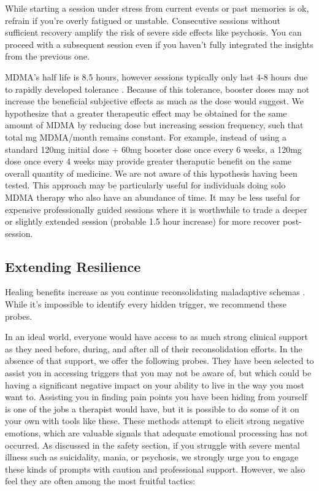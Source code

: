 \documentclass[12pt,letterpaper]{article}
\begin{document}
While starting a session under stress from current events or past memories is ok, refrain if you're overly fatigued or unstable.   Consecutive sessions without sufficient recovery amplify the risk of severe side effects like psychosis. You can proceed with a subsequent session even if you haven't fully integrated the insights from the previous one. 

MDMA's half life is 8.5 hours, however sessions typically only last 4-8 hours due to rapidly developed tolerance \cite{torrePharmacology,mithoeferManual,vizeliActuteEffects,farreTolerance}. Because of this tolerance, booster doses may not increase the beneficial subjective effects as much as the dose would suggest. We hypothesize that a greater therapeutic effect may be obtained for the same amount of MDMA by reducing dose but increasing session frequency, such that total mg MDMA/month remains constant. For example, instead of using a standard 120mg initial dose + 60mg booster dose once every 6 weeks, a 120mg dose once every 4 weeks may provide greater theraputic benefit on the same overall quantity of medicine. We are not aware of this hypothesis having been tested. This approach may be particularly useful for individuals doing solo MDMA therapy who also have an abundance of time. It may be less useful for expensive professionally guided sessions where it is worthwhile to trade a deeper or slightly extended session (probable 1.5 hour increase) for more recover post-session.
\subsection{Extending Resilience}
\label{completed}
Healing benefits increase as you continue reconsolidating maladaptive schemas \cite{rachmanProcessing}. While it's impossible to identify every hidden trigger, we recommend these probes.

In an ideal world, everyone would have access to as much strong clinical support as they need before, during, and after all of their reconsolidation efforts. In the absence of that support, we offer the following probes. They have been selected to assist you in accessing triggers that you may not be aware of, but which could be having a significant negative impact on your ability to live in the way you most want to. Assisting you in finding pain points you have been hiding from yourself is one of the jobs a therapist would have, but it is possible to do some of it on your own with tools like these. These methods attempt to elicit strong negative emotions, which are valuable signals that adequate emotional processing has not occurred. As discussed in the safety section, if you struggle with severe mental illness such as suicidality, mania, or psychosis, we strongly urge you to engage these kinds of prompts with caution and professional support. However, we also feel they are often among the most fruitful tactics:
\end{document}
